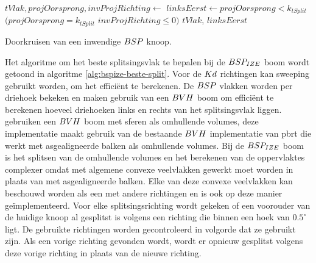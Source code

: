 \begin{dutchalgorithm}
    \begin{algorithmic}       
            \State $tVlak, projOorsprong, invProjRichting \gets $ 
            \State $linksEerst \gets projOorsprong < k_{tSplit}$ \Or $(projOorsprong = k_{tSplit}$ \And $invProjRichting \leq 0)$
            \State \Return $tVlak$, $linksEerst$
        \EndFunction
    \end{algorithmic}
    \caption{Doorkruisen van een inwendige $BSP$ knoop.}
    \label{alg:bsp-inwendige-doorkruising}
\end{dutchalgorithm}

Het algoritme om het beste splitsingsvlak te bepalen bij de $BSP_{IZE}$ boom wordt getoond in algoritme \ref{alg:bspize-beste-split}.
Voor de $Kd$ richtingen kan sweeping gebruikt worden, om het efficiënt te berekenen.
De $BSP$ vlakken worden per driehoek bekeken en maken gebruik van een $BVH$ boom om efficiënt te berekenen hoeveel driehoeken links en rechts van het splitsingsvlak liggen.
\authorIze{} \cite{ize} gebruiken een $BVH$ boom met sferen als omhullende volumes, deze implementatie maakt gebruik van de bestaande $BVH$ implementatie van pbrt die werkt met asgealigneerde balken als omhullende volumes.
Bij de $BSP_{IZE}$ boom is het splitsen van de omhullende volumes en het berekenen van de oppervlaktes complexer omdat met algemene convexe veelvlakken gewerkt moet worden in plaats van met asgealigneerde balken.
Elke van deze convexe veelvlakken kan beschouwd worden als een \symKDOP{} met andere richtingen en is ook op deze manier geïmplementeerd.
Voor elke splitsingsrichting wordt gekeken of een voorouder van de huidige knoop al gesplitst is volgens een richting die binnen een hoek van $0.5^{\circ}$ ligt. 
De gebruikte richtingen worden gecontroleerd in volgorde dat ze gebruikt zijn.
Als een vorige richting gevonden wordt, wordt er opnieuw gesplitst volgens deze vorige richting in plaats van de nieuwe richting.


